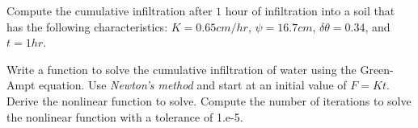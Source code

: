 \documentclass[a4paper,12pt]{article}
\begin{document}
\begin{enumerate}
	Compute the cumulative infiltration after $1$ hour of infiltration into a soil that has the following characteristics: $K = 0.65 cm/hr$, $\psi = 16.7 cm$, $\delta\theta = 0.34$, and $t = 1 hr$.
	
	Write a function to solve the cumulative infiltration of water using the Green-Ampt equation. Use \textit{Newton's method} and start at an initial value of $F = Kt$. Derive the nonlinear function to solve. Compute the number of iterations to solve the nonlinear function with a tolerance of 1.e-5.
 	
% 	

\end{enumerate}
\end{document}
